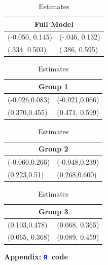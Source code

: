 \documentclass[12pt]{article}
\newcommand{\textR}[1]{\textcolor{blue}{\texttt{#1}}}
\newcommand{\R}{\textR{R}}
\begin{document}
\begin{table}[H]
\begin{tabular}{ |p{3cm}|p{3cm}|  }
\hline
\multicolumn{2}{|c|}{Full Model} \\
\hline
(-0.050, 0.145) & (-.046, 0.132) \\
\hline
(.334, 0.503) &  (.386, 0.595) \\
\hline
\end{tabular}
\quad
\begin{tabular}{ |p{3cm}|p{3cm}|  }
\hline
\multicolumn{2}{|c|}{Group 1} \\
\hline
(-0.026,0.083) & (-0.021,0.066) \\
\hline
(0.370,0.455) &  (0.471, 0.599) \\
\hline
\end{tabular}
\quad
\begin{tabular}{ |p{3cm}|p{3cm}|  }
\hline
\multicolumn{2}{|c|}{Group 2} \\
\hline
(-0.060,0.266) & (-0.048,0.239) \\
\hline
(0.223,0.51) &  (0.268,0.600) \\
\hline
\end{tabular}
\quad
\begin{tabular}{ |p{3cm}|p{3cm}|  }
\hline
\multicolumn{2}{|c|}{Group 3} \\
\hline
(0.103,0.478) & (0.068, 0.365) \\
\hline
(0.065, 0.368) & (0.089, 0.459)\\
\hline

\end{tabular}
\caption{Estimates}
\end{table}

\newpage






\newpage

\appendix
\begin{center}
{\Large {\bf Appendix: \R\ code}}
\end{center}
\end{document}
